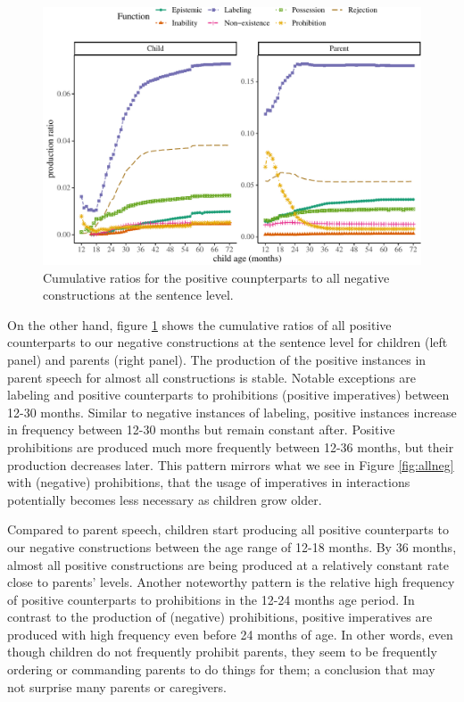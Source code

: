 \documentclass[
  english,
  man,floatsintext]{apa6}
\begin{document}
\begin{figure}[H]

{\centering \includegraphics{neg_construction_article_files/figure-latex/allpos-1} 

}

\caption{Cumulative ratios for the positive counpterparts to all negative constructions at the sentence level.}\label{fig:allpos}
\end{figure}

On the other hand, figure \ref{fig:allpos} shows the cumulative ratios of all positive counterparts to our negative constructions at the sentence level for children (left panel) and parents (right panel). The production of the positive instances in parent speech for almost all constructions is stable. Notable exceptions are labeling and positive counterparts to prohibitions (positive imperatives) between 12-30 months. Similar to negative instances of labeling, positive instances increase in frequency between 12-30 months but remain constant after. Positive prohibitions are produced much more frequently between 12-36 months, but their production decreases later. This pattern mirrors what we see in Figure \ref{fig:allneg} with (negative) prohibitions, that the usage of imperatives in interactions potentially becomes less necessary as children grow older.

Compared to parent speech, children start producing all positive counterparts to our negative constructions between the age range of 12-18 months. By 36 months, almost all positive constructions are being produced at a relatively constant rate close to parents' levels. Another noteworthy pattern is the relative high frequency of positive counterparts to prohibitions in the 12-24 months age period. In contrast to the production of (negative) prohibitions, positive imperatives are produced with high frequency even before 24 months of age. In other words, even though children do not frequently prohibit parents, they seem to be frequently ordering or commanding parents to do things for them; a conclusion that may not surprise many parents or caregivers.
\end{document}
